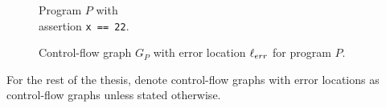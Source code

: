 \begin{center}
	\begin{minipage}[b]{0.4\linewidth}
		\begin{figure}[H]
			\centering
			
			\caption{Program $P$ with \\ assertion \texttt{x == 22}.}
			\label{codeWithAss}
		\end{figure}
	\end{minipage}
	\hfill
	\begin{minipage}[b]{0.59\linewidth}
		\begin{figure}[H]
			\centering
			
			\caption{Control-flow graph $G_P$ with error location $\ell_{err}$ for program $P$.}
			\label{cfg:P:Ass}
		\end{figure}
	\end{minipage}
\end{center}
For the rest of the thesis, denote control-flow graphs with error locations as control-flow graphs unless stated otherwise.
